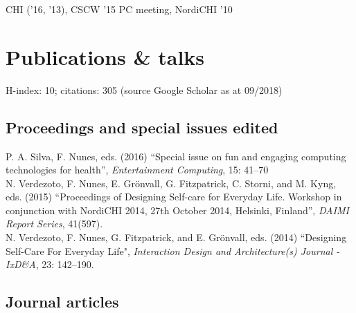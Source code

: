 \documentclass[11pt, a4paper]{article} %
\newcommand{\years}[1]{\marginnote{\scriptsize #1}} %
\begin{document}
CHI ('16, '13), CSCW '15 PC meeting, NordiCHI '10

\break





\section*{Publications \& talks}

H-index: 10; citations: 305 (source Google Scholar as at 09/2018)

\subsection*{Proceedings and special issues edited}

\years{2016}P. A. Silva, F. Nunes, eds. (2016) ``Special issue on fun and engaging computing technologies for health'', \emph{Entertainment Computing}, 15: 41--70\\
\years{2015}N. Verdezoto, F. Nunes, E. Grönvall, G. Fitzpatrick, C. Storni, and M. Kyng, eds. (2015) ``Proceedings of Designing Self-care for Everyday Life. Workshop in conjunction with NordiCHI 2014, 27th October 2014, Helsinki, Finland'', \emph{DAIMI Report Series}, 41(597).\\
\years{2014}N. Verdezoto, F. Nunes, G. Fitzpatrick, and E. Grönvall, eds. (2014) ``Designing Self-Care For Everyday Life", \emph{Interaction Design and Architecture(s) Journal - IxD\&A}, 23: 142--190.

\subsection*{Journal articles}
\end{document}

